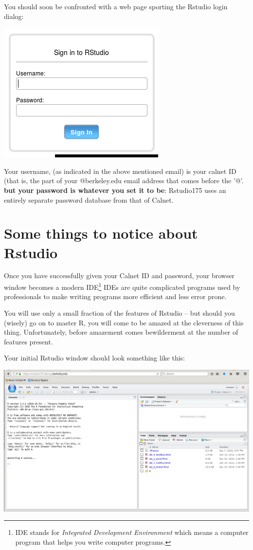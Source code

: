 \documentclass[11pt]{article}
\begin{document}
You should soon be confronted with a web page sporting the Rstudio login dialog:

\includegraphics[scale=.35]{RstudioSignin}

Your username, (as indicated in the above mentioned email) is your
calnet ID (that is, the part of your @berkeley.edu email address that comes before the '@'. \textbf{but your password is whatever you set it to be}:
Rstudio175 uses an entirely separate password database from that of
Calnet.

\section{Some things to notice about Rstudio}

Once you have successfully given your Calnet ID and password, your browser window becomes a modern IDE\footnote{IDE stands for \emph{Integrated Development Environment} which means a computer program that helps you write computer programs.} IDEs are quite complicated programs used by professionals to make writing programs more efficient and less error prone.

You will use only a small fraction of the features of Rstudio -- but should you (wisely) go on to master R, you will come to be amazed at the cleverness of this thing. Unfortunately,  before amazement comes bewilderment at the number of features present.

Your initial Rstudio window should look something like this:

\includegraphics[scale=.35]{RstudioStart}
\end{document}

